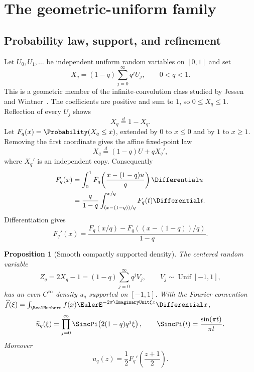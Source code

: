 \documentclass[11pt,a4paper,oneside]{article}
\newtheorem{proposition}[proposition]{Proposition}
\theoremstyle{definition}
\theoremstyle{remark}
\begin{document}
\section{The geometric-uniform family}
\label{sec:geometric-uniform}

\subsection{Probability law, support, and refinement}

Let $U_0,U_1,\ldots$ be independent uniform random variables on $[0,1]$ and
set
\begin{equation}
 X_q=(1-q)\sum_{j=0}^\infty q^jU_j,
 \qquad 0<q<1.
 \label{eq:Xq-definition}
\end{equation}
This is a geometric member of the infinite-convolution class studied by
Jessen and Wintner~\cite{JessenWintner1935}.  The coefficients are positive
and sum to $1$, so $0\le X_q\le1$.  Reflection
of every $U_j$ shows
\begin{equation}
 X_q\stackrel d=1-X_q.
 \label{eq:Xq-symmetry}
\end{equation}
Let $F_q(x)=\Probability(X_q\le x)$, extended by $0$ to $x\le0$ and by $1$ to
$x\ge1$.  Removing the first coordinate gives the affine fixed-point law
\begin{equation}
 X_q\stackrel d=(1-q)U+qX_q',
 \label{eq:Xq-fixed-point}
\end{equation}
where $X_q'$ is an independent copy.  Consequently
\begin{align}
 F_q(x)
 &=\int_0^1F_q\!\left(\frac{x-(1-q)u}{q}\right)\Differential u
 \label{eq:Fq-integral-equation}\\
 &=\frac q{1-q}
 \int_{(x-(1-q))/q}^{x/q}F_q(t)\Differential t.
 \label{eq:Fq-integral-equation-2}
\end{align}
Differentiation gives
\begin{equation}
 F_q'(x)=\frac{F_q(x/q)-F_q((x-(1-q))/q)}{1-q}.
 \label{eq:Fq-derivative}
\end{equation}

\begin{proposition}[Smooth compactly supported density]
\label{prop:uq-smooth}
The centered random variable
\begin{equation}
 Z_q=2X_q-1=(1-q)\sum_{j=0}^\infty q^jV_j,
 \qquad V_j\sim\operatorname{Unif}[-1,1],
 \label{eq:Zq-definition}
\end{equation}
has an even $C^\infty$ density $u_q$ supported on $[-1,1]$.  With the Fourier
convention
$\widehat f(\xi)=\int_\RealNumbers f(x)\EulerE^{-2\pi\ImaginaryUnit\xi x}\Differential x$,
\begin{equation}
 \widehat u_q(\xi)=\prod_{j=0}^\infty
 \SincPi\!\left(2(1-q)q^j\xi\right),
 \qquad
 \SincPi(t)=\frac{\sin(\pi t)}{\pi t}.
 \label{eq:uq-fourier-product}
\end{equation}
Moreover
\begin{equation}
 u_q(z)=\frac12F_q'\!\left(\frac{z+1}{2}\right).
 \label{eq:uq-Fq-relation}
\end{equation}
\end{proposition}
\end{document}
